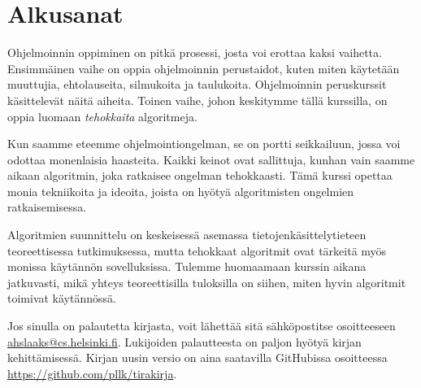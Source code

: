 \chapter{Alkusanat}

Ohjelmoinnin oppiminen on pitkä prosessi,
josta voi erottaa kaksi vaihetta.
Ensimmäinen vaihe on oppia ohjelmoinnin perustaidot,
kuten miten käyte\-tään muuttujia, ehtolauseita, silmukoita ja taulukoita.
Ohjelmoinnin peruskurssit käsittelevät näitä aiheita.
Toinen vaihe, johon keskitymme tällä kurssilla,
on oppia luomaan \emph{tehokkaita} algoritmeja.

Kun saamme eteemme ohjelmointiongelman,
se on portti seikkailuun, jossa voi odottaa monenlaisia haasteita.
Kaikki keinot ovat sallittuja, kunhan vain saamme aikaan
algoritmin, joka ratkaisee ongelman tehokkaasti.
Tämä kurssi opettaa monia tekniikoita ja ideoita,
joista on hyötyä algoritmisten ongelmien ratkaisemisessa.

Algoritmien suunnittelu on keskeisessä asemassa tietojenkäsittelytieteen
teoreettisessa tutkimuksessa, mutta tehokkaat algoritmit ovat
tärkeitä myös monissa käytännön sovelluksissa.
Tulemme huomaamaan kurssin aikana jatkuvasti,
mikä yhteys teoreettisilla tuloksilla on siihen,
miten hyvin algoritmit toimivat käytännössä.

Jos sinulla on palautetta kirjasta, voit lähettää sitä
sähköpostitse osoitteeseen \url{ahslaaks@cs.helsinki.fi}.
Lukijoiden palautteesta on paljon hyötyä
kirjan kehittämisessä.
Kirjan uusin versio on aina saatavilla GitHubissa
osoitteessa \url{https://github.com/pllk/tirakirja}.
